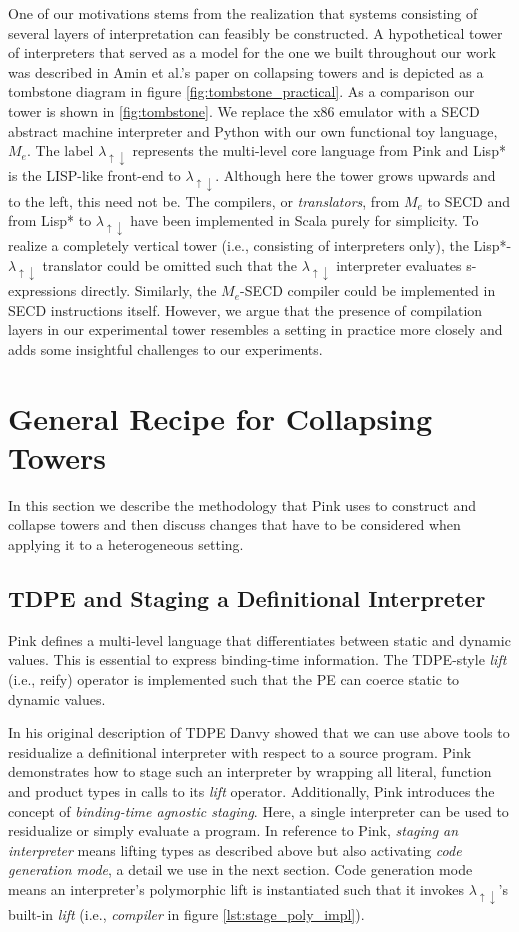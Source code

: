 \documentclass[a4paper,12pt,twoside,openright]{report}
\theoremstyle{definition}
\newcommand{\mslang}{$\lambda_{\uparrow\downarrow}$}
\newcommand{\mevl}{$M_{e}$}
\begin{document}
One of our motivations stems from the realization that systems consisting of several layers of interpretation can feasibly be constructed. A hypothetical tower of interpreters that served as a model for the one we built throughout our work was described in Amin et al.'s paper on collapsing towers \cite{amin2017collapsing} and is depicted as a tombstone diagram in figure \ref{fig:tombstone_practical}. As a comparison our tower is shown in \ref{fig:tombstone}. We replace the x86 emulator with a SECD abstract machine interpreter and Python with our own functional toy language, \mevl. The label \mslang{} represents the multi-level core language from Pink \cite{amin2017collapsing} and Lisp* is the LISP-like front-end to \mslang. Although here the tower grows upwards and to the left, this need not be. The compilers, or \textit{translators}, from \mevl{} to SECD and from Lisp* to \mslang{} have been implemented in Scala purely for simplicity. To realize a completely vertical tower (i.e., consisting of interpreters only), the Lisp*-\mslang{} translator could be omitted such that the \mslang{} interpreter evaluates s-expressions directly. Similarly, the \mevl-SECD compiler could be implemented in SECD instructions itself. However, we argue that the presence of compilation layers in our experimental tower resembles a setting in practice more closely and adds some insightful challenges to our experiments.

\section{General Recipe for Collapsing Towers}\label{sec:recipe}
In this section we describe the methodology that Pink uses to construct and collapse towers and then discuss changes that have to be considered when applying it to a heterogeneous setting.

\subsection{TDPE and Staging a Definitional Interpreter}\label{subsec:stage_def_interp}
Pink defines a multi-level language that differentiates between static and dynamic values. This is essential to express binding-time information. The TDPE-style \textit{lift} (i.e., reify) operator is implemented such that the PE can coerce static to dynamic values.

In his original description of TDPE  Danvy \cite{danvy1999type} showed that we can use above tools to residualize a definitional interpreter with respect to a source program. Pink demonstrates how to stage such an interpreter by wrapping all literal, function and product types in calls to its \textit{lift} operator. Additionally, Pink introduces the concept of \textit{binding-time agnostic staging}. Here, a single interpreter can be used to residualize or simply evaluate a program. In reference to Pink, \textit{staging an interpreter} means lifting types as described above but also activating \textit{code generation mode}, a detail we use in the next section. Code generation mode means an interpreter's polymorphic lift is instantiated such that it invokes \mslang's built-in \textit{lift} (i.e., \textit{compiler} in figure \ref{lst:stage_poly_impl}).
\end{document}
